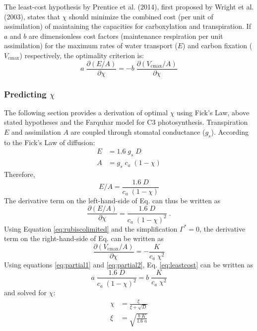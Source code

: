 \documentclass{myreport}
\begin{document}
The least-cost hypothesis by Prentice et al. (2014), first proposed by Wright et al. (2003), states that $\chi$ should minimize the combined cost (per unit of assimilation) of maintaining the capacities for carboxylation and transpiration. 
If $a$ and $b$ are dimensionless cost factors (maintenance respiration per unit assimilation) for the maximum rates of water transport ($E$) and carbon fixation ($V_{\mathrm{cmax}}$) respectively, the optimality criterion is:
\begin{equation}
\label{eq:leastcost}
    a \; \frac{\partial (E/A)}{\partial \chi} = -b \; \frac{\partial (V_{\mathrm{cmax}}/A)}{\partial \chi}
\end{equation}

\subsubsection{Predicting $\chi$}
The following section provides a derivation of optimal $\chi$ using Fick's Law, above stated hypotheses and the Farquhar model for C3 photosynthesis. 
Transpiration $E$ and assimilation $A$ are coupled through stomatal conductance ($g_s$).
According to the Fick's Law of diffusion:
\begin{align}
\label{eq:fick}
    E &= 1.6 \; g_s \; D \\
    A &= g_s \; c_a \; (1-\chi)
\end{align}
Therefore,
\begin{equation}
    E/A = \frac{1.6 \; D}{c_a\;(1-\chi)}
\end{equation}
The derivative term on the left-hand-side of Eq.\label{eq:leastcost} can thus be written as
\begin{equation}
\label{eq:partial1}
    \frac{\partial (E/A)}{\partial \chi} = \frac{1.6\;D}{c_a\;(1-\chi)^2}\;.
\end{equation}
Using Equation \ref{eq:rubiscolimited} and the simplification $\Gamma^{\ast}=0$, the derivative term on the right-hand-side of Eq.\label{eq:leastcost} can be written as
\begin{equation}
\label{eq:partial2}
    \frac{\partial (V_{\mathrm{cmax}}/A)}{\partial \chi} = - \frac{K}{c_a\;\chi^2}
\end{equation}
Using equations \ref{eq:partial1} and \ref{eq:partial2}, Eq. \ref{eq:leastcost} can be written as
\begin{equation}
    a\;\frac{1.6\;D}{c_a\;(1-\chi)^2} = b\;\frac{K}{c_a\;\chi^2}
\end{equation}
and solved for $\chi$:
\begin{align}
    \chi &= \frac{\xi}{\xi + \sqrt{D}} \\ 
    \xi &= \sqrt{\frac{b\;K}{1.6\;a}}
\end{align}
\end{document}
